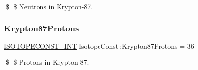 \$ \$ Neutrons in Krypton-\/87. \mbox{\label{group___isotope_const-_krypton-_kr87_ga7e506ec5946d053221dfcfbd4c302aee}} 
\subsubsection{\texorpdfstring{Krypton87\+Protons}{Krypton87Protons}}
{\footnotesize\ttfamily \mbox{\hyperlink{group___isotope_const-_macros_ga5f18360b3e99483a35c32d789e62621c}{I\+S\+O\+T\+O\+P\+E\+C\+O\+N\+S\+T\+\_\+\+I\+NT}} Isotope\+Const\+::\+Krypton87\+Protons = 36}

\$ \$ Protons in Krypton-\/87. 